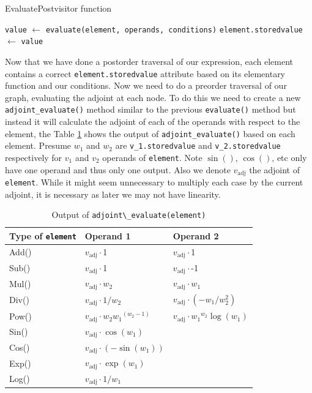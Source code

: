 \documentclass{article}
\begin{document}
\begin{algorithm}[h!]
\caption{EvaluatePostvisitor function}\label{EvaluatePostvisitor}
\begin{algorithmic}[1]
\State \verb|value| $\gets$ \verb|evaluate(element, operands, conditions)|
\State \verb|element.storedvalue| $\gets$ \verb|value|
\EndFor
\EndProcedure
\end{algorithmic}
\end{algorithm}

Now that we have done a postorder traversal of our expression, each element contains a correct \verb|element.storedvalue| attribute based on its elementary function and our conditions. Now we need to do a preorder traversal of our graph, evaluating the adjoint at each node. To do this we need to create a new \verb|adjoint_evaluate()| method similar to the previous \verb|evaluate()| method but instead it will calculate the adjoint of each of the operands with respect to the element, the Table \ref{tab:AdjEval} shows the output of \verb|adjoint_evaluate()| based on each element. Presume $w_1$ and $w_2$ are \verb|v_1.storedvalue| and \verb|v_2.storedvalue| respectively for $v_1$ and $v_2$ operands of \verb|element|. Note $\sin()$, $\cos()$, etc only have one operand and thus only one output. Also we denote $v_\mathrm{adj}$ the adjoint of \verb|element|. While it might seem unnecessary to multiply each case by the current adjoint, it is necessary as later we may not have linearity.

\begin{table}[h!]
    \centering
    \begin{tabular}{|lll|}
        \hline
        Type of \verb|element| & Operand 1  & Operand 2 \\
        \hline
        Add() & $v_\mathrm{adj}\cdot $1 & $v_\mathrm{adj}\cdot $1 \\
        Sub() & $v_\mathrm{adj}\cdot $1 & $v_\mathrm{adj}\cdot $-1 \\
        Mul() & $v_\mathrm{adj}\cdot w_2$ & $v_\mathrm{adj}\cdot w_1$ \\
        Div() & $v_\mathrm{adj}\cdot 1/w_2$ & $v_\mathrm{adj}\cdot (-w_1/w_2^2)$ \\
        Pow() & $v_\mathrm{adj}\cdot w_2{w_1}^{(w_2-1)}$ & $v_\mathrm{adj}\cdot {w_1}^{w_2}\log(w_1)$ \\
        \hdashline
        Sin() & $v_\mathrm{adj}\cdot \cos(w_1)$ &  \\
        Cos() & $v_\mathrm{adj}\cdot (-\sin(w_1))$ &  \\
        Exp() & $v_\mathrm{adj}\cdot \exp(w_1)$ &  \\
        Log() & $v_\mathrm{adj}\cdot 1/w_1$ &  \\
        \hline
    \end{tabular}
    \caption{Output of \verb|adjoint\_evaluate(element)| \cite{github}}
    \label{tab:AdjEval}
\end{table}
\end{document}
